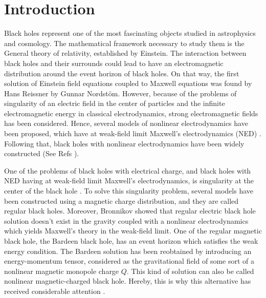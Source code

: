 \documentclass[10pt,letterpaper]{article}
\begin{document}
\section{Introduction}

Black holes represent one of the most fascinating objects studied in astrophysics and cosmology.  The mathematical framework necessary to study them is the General theory of relativity, established by Einstein\cite{einstein1916The}. The interaction between black holes and their surrounds could lead to have an electromagnetic distribution around the event horizon of black holes. On that way, the first solution of Einstein field equations coupled to Maxwell equations was found by Hans Reissner\cite{Reissner1916uber} by Gunnar Nordst\"om\cite{nordstrom1918on}. However, because of the problems of singularity of an electric field in the center of particles and the infinite electromagnetic energy in classical electrodynamics, strong electromagnetic fields has been considered. Hence, several models of nonlinear electrodynamics have been proposed, which have at weak-field limit Maxwell's electrodynamics (NED) \cite{kruglov2015model,kruglov2015nonlinear,kruglov2017notes,bandos2020nonlinear,born1934quantum,kosyakov2020nonlinear}. Following that, black holes with nonlinear electrodynamics have been widely constructed (See Refs \cite{kruglov2017nonlinear,amirabi2020black,pantig2022shadow,kruglov2022ads,gullu2021black,flores2021black}).
	
	One of the problems of black holes with electrical charge, and black holes with NED having at weak-field limit Maxwell's electrodynamics, is singularity at the center of the black hole \cite{amirabi2020black}. To solve this singularity problem, several models have been constructed using a magnetic charge distribution, and they are called regular black holes. Moreover, Bronnikov \cite{bronnikov2001regular} showed that regular electric black hole solution doesn't exist in the gravity coupled with a nonlinear electrodynamics which yields Maxwell's theory in the weak-field limit. One of the regular magnetic black hole, the Bardeen black hole, has an event horizon which satisfies the weak energy condition\cite{bardeen1968non,Mahamat2018}. The Bardeen solution has been reobtained by introducing an energy-momentum tensor, considered as the gravitational field of some sort of a nonlinear magnetic monopole charge $Q$\cite{ayon2000bardeen}. This kind of solution can also be called nonlinear magnetic-charged black hole.  Hereby, this is why this alternative has received considerable attention \cite{breton2005stability,abdujabbarov2013charged,ruffini2013einstein,lim2015motion,allahyari2020magnetically}.
\end{document}

